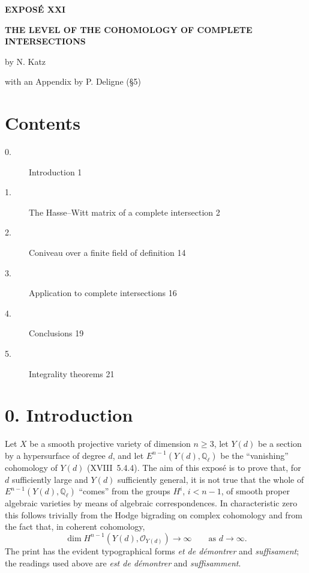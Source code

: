 \clearpage
\begin{center}
{\Large\bfseries EXPOSÉ XXI}\par
\vspace{1.5cm}
{\Large\bfseries THE LEVEL OF THE COHOMOLOGY OF COMPLETE
INTERSECTIONS}\par
\vspace{0.8cm}
{\large by N. Katz}\par
\vspace{0.5cm}
with an Appendix by P. Deligne (\S 5)
\end{center}

\vspace{1.5cm}
\section*{Contents}
\begin{description}
\item[0.] Introduction \hfill 1
\item[1.] The Hasse--Witt matrix of a complete intersection \hfill 2
\item[2.] Coniveau over a finite field of definition \hfill 14
\item[3.] Application to complete intersections \hfill 16
\item[4.] Conclusions \hfill 19
\item[5.] Integrality theorems \hfill 21
\end{description}

\clearpage
\section*{0. Introduction}

Let $X$ be a smooth projective variety of dimension $n\geq3$, let $Y(d)$
be a section by a hypersurface of degree $d$, and let
$E^{n-1}(Y(d),\mathbb Q_\ell)$ be the ``vanishing'' cohomology of $Y(d)$
(XVIII~5.4.4).  The aim of this exposé is to prove that, for $d$
sufficiently large and $Y(d)$ sufficiently general, it is not true that the
whole of $E^{n-1}(Y(d),\mathbb Q_\ell)$ ``comes'' from the groups $H^i$,
$i<n-1$, of smooth proper algebraic varieties by means of algebraic
correspondences.  In characteristic zero this follows trivially from the
Hodge bigrading on complex cohomology and from the fact that, in coherent
cohomology,
\begin{equation*}
\dim H^{n-1}(Y(d),\mathcal O_{Y(d)})\longrightarrow\infty
\qquad\text{as }d\longrightarrow\infty.
\end{equation*}
The print has the evident typographical forms \emph{et de démontrer} and
\emph{suffisament}; the readings used above are \emph{est de démontrer} and
\emph{suffisamment}.

